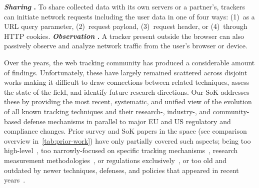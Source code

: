 %
\textbf{\textit{Sharing} \symSharing.}
%
To share collected data with its own servers or a partner's, trackers can initiate network requests including the user data in one of four ways: (1)~as a URL query parameter, (2)~request payload, (3)~request header, or (4)~through HTTP cookies.
%
%
%
\textbf{\textit{Observation} \symObservation.}
%
A tracker present outside the browser can also passively observe and analyze network traffic from the user's browser or device.


%
Over the years, the web tracking community has produced a considerable amount of findings.
%
Unfortunately, these have largely remained scattered across disjoint works making it difficult to draw connections between related techniques, assess the state of the field, and identify future research directions.
%
Our SoK addresses these by providing the most recent, systematic, and unified view of the evolution of all known tracking techniques and their research-, industry-, and community-based defense mechanisms in parallel to major EU and US regulatory and compliance changes.
%
Prior survey and SoK papers in the space (see comparison overview in~\autoref{tab:prior-work}) have only partially covered such aspects; being too high-level~\cite{ermakova2018web,bujlowSurveyWebTracking2017}, too narrowly-focused on specific tracking mechanisms~\cite{laperdrix2020browser,rokickiSoKSearchLost2021}, research measurement methodologies~\cite{stafeevSoKStateKrawlers2024,riederSoKDecadesWeb2026}, or regulations exclusively~\cite{birrellSoKTechnicalImplementation2024}, or too old and outdated by newer techniques, defenses, and policies that appeared in recent years~\cite{mayerThirdPartyWebTracking2012,sanchez-rolaWebWatchingYou2017}.
%
